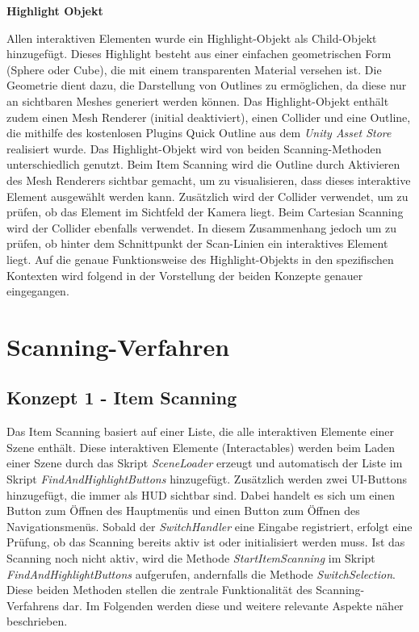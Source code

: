 {\normalfont \bfseries Highlight Objekt}

Allen interaktiven Elementen wurde ein Highlight-Objekt als Child-Objekt hinzugefügt. Dieses Highlight besteht aus einer einfachen geometrischen Form (Sphere oder Cube), die mit einem transparenten Material versehen ist. Die Geometrie dient dazu, die Darstellung von Outlines zu ermöglichen, da diese nur an sichtbaren Meshes generiert werden können. Das Highlight-Objekt enthält zudem einen Mesh Renderer (initial deaktiviert), einen Collider und eine Outline, die mithilfe des kostenlosen Plugins Quick Outline \citep{chris_nolet_quick_2022} aus dem \textit{Unity Asset Store} realisiert wurde.
Das Highlight-Objekt wird von beiden Scanning-Methoden unterschiedlich genutzt. Beim Item Scanning wird die Outline durch Aktivieren des Mesh Renderers sichtbar gemacht, um zu visualisieren, dass dieses interaktive Element ausgewählt werden kann. Zusätzlich wird der Collider verwendet, um zu prüfen, ob das Element im Sichtfeld der Kamera liegt. Beim Cartesian Scanning wird der Collider ebenfalls verwendet. In diesem Zusammenhang jedoch um zu prüfen, ob hinter dem Schnittpunkt der Scan-Linien ein interaktives Element liegt. Auf die genaue Funktionsweise des Highlight-Objekts in den spezifischen Kontexten wird folgend in der Vorstellung der beiden Konzepte genauer eingegangen. 

\section{Scanning-Verfahren}

\subsection{Konzept 1 - Item Scanning}

Das Item Scanning basiert auf einer Liste, die alle interaktiven Elemente einer Szene enthält. Diese interaktiven Elemente (Interactables) werden beim Laden einer Szene durch das Skript \textit{SceneLoader} erzeugt und automatisch der Liste im Skript \textit{FindAndHighlightButtons} hinzugefügt. Zusätzlich werden zwei UI-Buttons hinzugefügt, die immer als HUD sichtbar sind. Dabei handelt es sich um einen Button zum Öffnen des Hauptmenüs und einen Button zum Öffnen des Navigationsmenüs. Sobald der \textit{SwitchHandler} eine Eingabe registriert, erfolgt eine Prüfung, ob das Scanning bereits aktiv ist oder initialisiert werden muss. Ist das Scanning noch nicht aktiv, wird die Methode \textit{StartItemScanning} im Skript \textit{FindAndHighlightButtons} aufgerufen, andernfalls die Methode \textit{SwitchSelection}. Diese beiden Methoden stellen die zentrale Funktionalität des Scanning-Verfahrens dar. Im Folgenden werden diese und weitere relevante Aspekte näher beschrieben.

